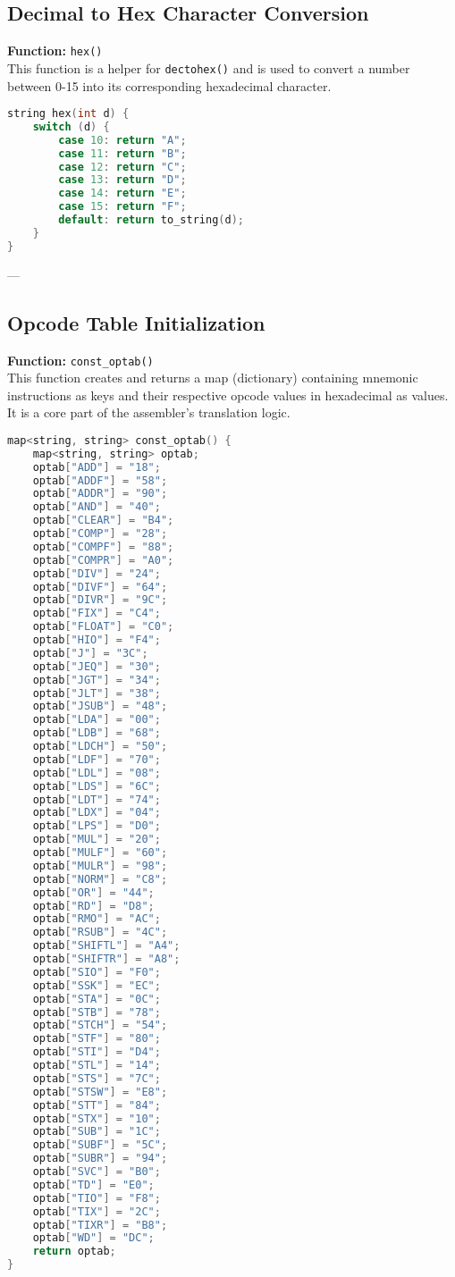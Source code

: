 \documentclass[12pt]{article}
\begin{document}
\subsection{Decimal to Hex Character Conversion}
\textbf{Function:} \texttt{hex()} \\
This function is a helper for \texttt{dectohex()} and is used to convert a number between 0-15 into its corresponding hexadecimal character.

\begin{lstlisting}[language=C++, caption={hex() - Decimal (0-15) to Hex Character}]
string hex(int d) {
    switch (d) {
        case 10: return "A";
        case 11: return "B";
        case 12: return "C";
        case 13: return "D";
        case 14: return "E";
        case 15: return "F";
        default: return to_string(d);
    }
}
\end{lstlisting}

---

\subsection{Opcode Table Initialization}
\textbf{Function:} \texttt{const\_optab()} \\
This function creates and returns a map (dictionary) containing mnemonic instructions as keys and their respective opcode values in hexadecimal as values. It is a core part of the assembler’s translation logic.

\begin{lstlisting}[language=C++, caption={const\_optab() - Opcode Table Initialization}]
map<string, string> const_optab() {
    map<string, string> optab;
    optab["ADD"] = "18";
    optab["ADDF"] = "58";
    optab["ADDR"] = "90";
    optab["AND"] = "40";
    optab["CLEAR"] = "B4";
    optab["COMP"] = "28";
    optab["COMPF"] = "88";
    optab["COMPR"] = "A0";
    optab["DIV"] = "24";
    optab["DIVF"] = "64";
    optab["DIVR"] = "9C";
    optab["FIX"] = "C4";
    optab["FLOAT"] = "C0";
    optab["HIO"] = "F4";
    optab["J"] = "3C";
    optab["JEQ"] = "30";
    optab["JGT"] = "34";
    optab["JLT"] = "38";
    optab["JSUB"] = "48";
    optab["LDA"] = "00";
    optab["LDB"] = "68";
    optab["LDCH"] = "50";
    optab["LDF"] = "70";
    optab["LDL"] = "08";
    optab["LDS"] = "6C";
    optab["LDT"] = "74";
    optab["LDX"] = "04";
    optab["LPS"] = "D0";
    optab["MUL"] = "20";
    optab["MULF"] = "60";
    optab["MULR"] = "98";
    optab["NORM"] = "C8";
    optab["OR"] = "44";
    optab["RD"] = "D8";
    optab["RMO"] = "AC";
    optab["RSUB"] = "4C";
    optab["SHIFTL"] = "A4";
    optab["SHIFTR"] = "A8";
    optab["SIO"] = "F0";
    optab["SSK"] = "EC";
    optab["STA"] = "0C";
    optab["STB"] = "78";
    optab["STCH"] = "54";
    optab["STF"] = "80";
    optab["STI"] = "D4";
    optab["STL"] = "14";
    optab["STS"] = "7C";
    optab["STSW"] = "E8";
    optab["STT"] = "84";
    optab["STX"] = "10";
    optab["SUB"] = "1C";
    optab["SUBF"] = "5C";
    optab["SUBR"] = "94";
    optab["SVC"] = "B0";
    optab["TD"] = "E0";
    optab["TIO"] = "F8";
    optab["TIX"] = "2C";
    optab["TIXR"] = "B8";
    optab["WD"] = "DC";
    return optab;
}
\end{lstlisting}
\end{document}

